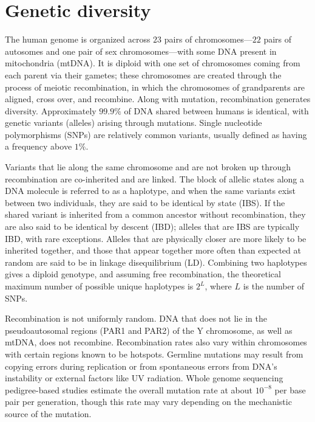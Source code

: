 \section{Genetic diversity}

The human genome is organized across $23$ pairs of chromosomes---$22$ pairs of autosomes and one pair of sex chromosomes---with some DNA present in mitochondria (mtDNA). It is diploid with one set of chromosomes coming from each parent via their gametes; these chromosomes are created through the process of meiotic recombination, in which the chromosomes of grandparents are aligned, cross over, and recombine. Along with mutation, recombination generates diversity. Approximately $99.9\%$ of DNA shared between humans is identical, with genetic variants (alleles) arising through mutations. Single nucleotide polymorphisms (SNPs) are relatively common variants, usually defined as having a frequency above $1\%$.

Variants that lie along the same chromosome and are not broken up through recombination are co-inherited and are linked. The block of allelic states along a DNA molecule is referred to as a haplotype, and when the same variants exist between two individuals, they are said to be identical by state (IBS). If the shared variant is inherited from a common ancestor without recombination, they are also said to be identical by descent (IBD); alleles that are IBS are typically IBD, with rare exceptions. Alleles that are physically closer are more likely to be inherited together, and those that appear together more often than expected at random are said to be in linkage disequilibrium (LD). Combining two haplotypes gives a diploid genotype, and assuming free recombination, the theoretical maximum number of possible unique haplotypes is $2^L$, where $L$ is the number of SNPs.

Recombination is not uniformly random. DNA that does not lie in the pseudoautosomal regions (PAR1 and PAR2) of the Y chromosome, as well as mtDNA, does not recombine\citep{jobling_human_2013}. Recombination rates also vary within chromosomes with certain regions known to be hotspots\citep{altemose_map_2017}. Germline mutations may result from copying errors during replication or from spontaneous errors from DNA’s instability or external factors like UV radiation. Whole genome sequencing pedigree-based studies estimate the overall mutation rate at about $10^{-8}$ per base pair per generation, though this rate may vary depending on the mechanistic source of the mutation\citep{segurel_determinants_2014}.

